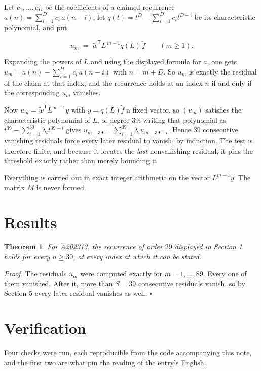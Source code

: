 \documentclass[11pt]{article}
\newtheorem{theorem}{Theorem}
\theoremstyle{definition}
\begin{document}
Let $c_1,\dots,c_D$ be the coefficients of a claimed recurrence $a(n) = \sum_{i=1}^{D} c_i\,a(n-i)$, let $q(t) = t^{D} - \sum_{i=1}^{D} c_i t^{D-i}$ be its characteristic polynomial, and put

\[u_m \;=\; \tilde w^{\mathsf T} L^{\,m-1} q(L)\,\tilde f \qquad (m \ge 1).\]

Expanding the powers of $L$ and using the displayed formula for $a$, one gets $u_m = a(n) - \sum_{i=1}^{D} c_i\,a(n-i)$ with $n = m + D$. So $u_m$ is exactly the residual of the claim at that index, and the recurrence holds at an index $n$ if and only if the corresponding $u_m$ vanishes.

Now $u_m = \tilde w^{\mathsf T} L^{m-1} y$ with $y = q(L)\tilde f$ a fixed vector, so $(u_m)$ satisfies the characteristic polynomial of $L$, of degree $39$: writing that polynomial as $t^{39} - \sum_{i=1}^{39} \lambda_i t^{39-i}$ gives $u_{m+39} = \sum_{i=1}^{39} \lambda_i u_{m+39-i}$. Hence $39$ consecutive vanishing residuals force every later residual to vanish, by induction. The test is therefore finite; and because it locates the {\itshape last} nonvanishing residual, it pins the threshold exactly rather than merely bounding it.

Everything is carried out in exact integer arithmetic on the vector $L^{m-1}y$. The matrix $M$ is never formed.

\section{Results}

\begin{theorem} For A202313, the recurrence of order $29$ displayed in Section 1 holds for every $n \ge 30$, at every index at which it can be stated.\end{theorem}

{\itshape Proof.} The residuals $u_m$ were computed exactly for $m = 1,\dots,89$. Every one of them vanished. After it, more than $S = 39$ consecutive residuals vanish, so by Section 5 every later residual vanishes as well. $\square$

\section{Verification}

Four checks were run, each reproducible from the code accompanying this note, and the first two are what pin the reading of the entry's English.
\end{document}
